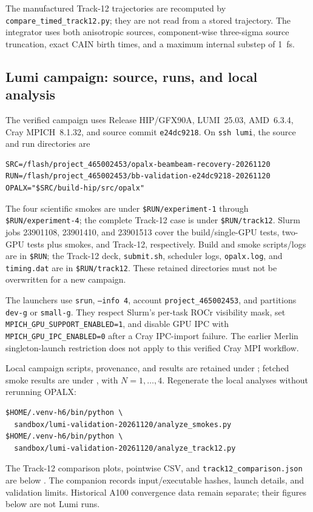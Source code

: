 \documentclass[11pt,a4paper]{article}
\newcommand{\code}[1]{\texttt{#1}}
\begin{document}
The manufactured Track-12 trajectories are recomputed by
\code{compare\_timed\_track12.py}; they are not read from a stored trajectory.
The integrator uses both anisotropic sources, component-wise three-sigma source
truncation, exact CAIN birth times, and a maximum internal substep of
\SI{1}{\femto\second}.

\subsection{Lumi campaign: source, runs, and local analysis}
\label{app:lumi}

The verified campaign uses Release HIP/GFX90A, LUMI~25.03, AMD~6.3.4,
Cray MPICH~8.1.32, and source commit \code{e24dc9218}.  On \code{ssh lumi},
the source and run directories are
\begin{lstlisting}[style=commands]
SRC=/flash/project_465002453/opalx-beambeam-recovery-20261120
RUN=/flash/project_465002453/bb-validation-e24dc9218-20261120
OPALX="$SRC/build-hip/src/opalx"
\end{lstlisting}
The four scientific smokes are under \code{\$RUN/experiment-1} through
\code{\$RUN/experiment-4}; the complete Track-12 case is under
\code{\$RUN/track12}.  Slurm jobs 23901108, 23901410, and 23901513 cover the
build/single-GPU tests, two-GPU tests plus smokes, and Track-12, respectively.
Build and smoke scripts/logs are in \code{\$RUN}; the Track-12 deck,
\code{submit.sh}, scheduler logs, \code{opalx.log}, and \code{timing.dat}
are in \code{\$RUN/track12}.  These retained directories must not be overwritten
for a new campaign.

The launchers use \code{srun}, \code{--info 4}, account
\code{project\_465002453}, and partitions \code{dev-g} or \code{small-g}.
They respect Slurm's per-task ROCr visibility mask, set
\code{MPICH\_GPU\_SUPPORT\_ENABLED=1}, and disable GPU IPC with
\code{MPICH\_GPU\_IPC\_ENABLED=0} after a Cray IPC-import failure.
The earlier Merlin singleton-launch restriction does not apply to this
verified Cray MPI workflow.

Local campaign scripts, provenance, and results are retained under
; fetched smoke results are under
, with $N=1,\ldots,4$.
Regenerate the local analyses without rerunning OPALX:
\begin{lstlisting}[style=commands]
$HOME/.venv-h6/bin/python \
  sandbox/lumi-validation-20261120/analyze_smokes.py
$HOME/.venv-h6/bin/python \
  sandbox/lumi-validation-20261120/analyze_track12.py
\end{lstlisting}
The Track-12 comparison plots, pointwise CSV, and
\code{track12\_comparison.json} are below
.
The companion  records
input/executable hashes, launch details, and validation limits.  Historical
A100 convergence data remain separate; their figures below are not Lumi runs.
\end{document}
